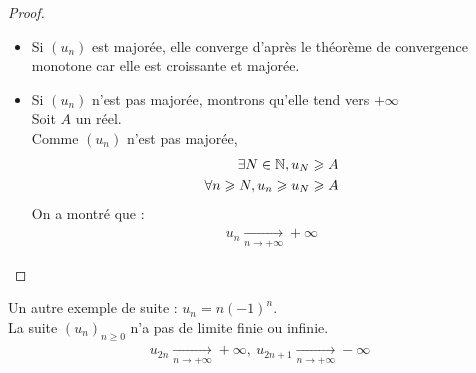\begin{proof}~ 
    \begin{itemize}
        \item Si $(u_n)$ est majorée, elle converge d'après le théorème de convergence monotone car elle est croissante et majorée.
        \item Si $(u_n)$ n'est pas majorée, montrons qu'elle tend vers $+\infty$ \\
        Soit $A$ un réel. \\
        Comme $(u_n)$ n'est pas majorée, 
        \begin{align*}
            \exists N \in \mathbb{N}, u_N \geqslant A \\
            \forall n \geqslant N, u_n \geqslant u_N \geqslant A
        \end{align*}
        On a montré que :
        \begin{align*}
            u_n \xrightarrow[n \to +\infty]{} +\infty
        \end{align*}
    \end{itemize}
\end{proof}

\begin{exemple}
    Un autre exemple de suite : $u_n = n(-1)^n$. \\
    La suite $(u_n)_{n \geq 0}$ n'a pas de limite finie ou infinie.
    \begin{align*}
        u_{2n} \xrightarrow[n \to +\infty]{} +\infty,\ u_{2n+1} \xrightarrow[n \to +\infty]{} -\infty
    \end{align*}
\end{exemple}